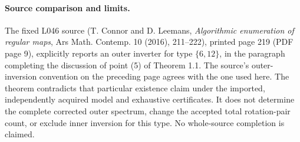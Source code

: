 \documentclass[11pt,a4paper]{article}
\begin{document}
\paragraph{Source comparison and limits.}
The fixed L046 source (T. Connor and D. Leemans, \emph{Algorithmic
enumeration of regular maps}, Ars Math. Contemp. 10 (2016), 211--222),
printed page 219 (PDF page 9), explicitly reports
an outer inverter for type $\{6,12\}$, in the paragraph completing the
discussion of point (5) of Theorem 1.1. The source's outer-inversion
convention on the preceding page agrees with the one used here.
The theorem contradicts that particular existence claim under the
imported, independently acquired model and exhaustive certificates.
It does not determine the complete corrected outer spectrum, change
the accepted total rotation-pair count, or exclude inner inversion for
this type. No whole-source completion is claimed.
\end{document}
